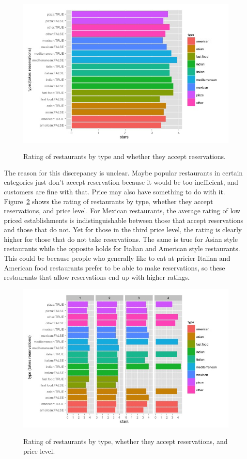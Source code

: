 \documentclass[11pt]{article}
\begin{document}
\begin{figure}[h]
\caption{Rating of restaurants by type and whether they accept reservations.}
\centering
\includegraphics[width=0.7\linewidth]{Figures/food_res_stars.jpeg}
\label{fig:food_res_stars}
\end{figure}

The reason for this discrepancy is unclear. Maybe popular restaurants in certain categories just don't accept reservation because it would be too inefficient, and customers are fine with that. Price may also have something to do with it. Figure~\ref{fig:food_res_3} shows the rating of restaurants by type, whether they accept reservations, and price level. For Mexican restaurants, the average rating of low priced establishments is indistinguishable between those that accept reservations and those that do not. Yet for those in the third price level, the rating is clearly higher for those that do not take reservations. The same is true for Asian style restaurants while the opposite holds for Italian and American style restaurants. This could be because people who generally like to eat at pricier Italian and American food restaurants prefer to be able to make reservations, so these restaurants that allow reservations end up with higher ratings.

\begin{figure}[p]
\caption{Rating of restaurants by type, whether they accept reservations, and price level.}
\centering
\includegraphics[width=0.8\linewidth]{Figures/food_res_3.jpeg}
\label{fig:food_res_3}
\end{figure}
\end{document}
